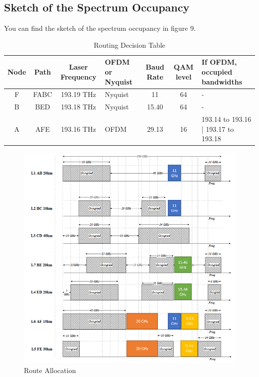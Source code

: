 \documentclass{article}
\begin{document}
\subsection{Sketch of the Spectrum Occupancy}

You can find the sketch of the spectrum occupancy in figure 9.

\begin{table}[htb!]
    \centering
    \begin{tabular}{|c|c|c|p{2.5cm}|c|c|p{2.5cm}|}
    \hline
        Node & Path & Laser Frequency & OFDM or Nyquist & Baud Rate & QAM level & If OFDM, occupied bandwidths \\ \hline
        F & FABC & 193.19 THz & Nyquist & 11 & 64 & -  \\ \hline
        B & BED & 193.18 THz & Nyquist & 15.40 & 64 & - \\ \hline
        A & AFE & 193.16 THz & OFDM & 29.13 & 16 & 193.14 to 193.16 | 193.17 to 193.18 \\ \hline
    \end{tabular}
    \caption{Routing Decision Table}
\end{table}

\begin{figure}[htb!]
    \centering
    \includegraphics[scale=0.5]{route-allocation}
    \caption{Route Allocation}
\end{figure}
\end{document}
